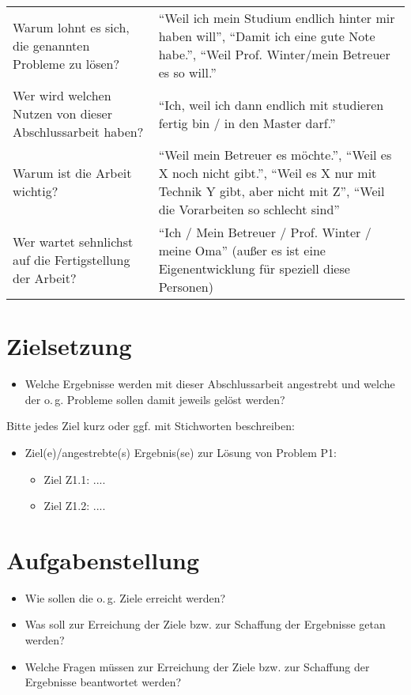 \begin{tabulary}{0.965\textwidth}{LL}
Warum lohnt es sich, die genannten Probleme zu lösen?						&\enquote{Weil ich mein Studium endlich hinter mir haben will}, \enquote{Damit ich eine gute Note habe.}, \enquote{Weil Prof. Winter/mein Betreuer es so will.}\\
Wer wird welchen Nutzen von dieser Abschlussarbeit haben?					&\enquote{Ich, weil ich dann endlich mit studieren fertig bin / in den Master darf.}\\
Warum ist die Arbeit wichtig?												&\enquote{Weil mein Betreuer es möchte.}, \enquote{Weil es X noch nicht gibt.}, \enquote{Weil es X nur mit Technik Y gibt, aber nicht mit Z}, \enquote{Weil die Vorarbeiten so schlecht sind}\\
Wer wartet sehnlichst auf die Fertigstellung der Arbeit?					&\enquote{Ich / Mein Betreuer / Prof. Winter / meine Oma} (außer es ist eine Eigenentwicklung für speziell diese Personen)\\
\end{tabulary}

\section{Zielsetzung}\label{sec:zielsetzung}

\begin{itemize}
\item Welche Ergebnisse werden mit dieser Abschlussarbeit angestrebt und welche der o.\,g. Probleme sollen damit jeweils gelöst werden?
\end{itemize}
Bitte jedes Ziel kurz oder ggf. mit Stichworten beschreiben:
\begin{itemize}
\item Ziel(e)/angestrebte(s) Ergebnis(se) zur Lösung von Problem P1:
	\begin{itemize}
	\item Ziel Z1.1: ....
	\item Ziel Z1.2: ....
	\end{itemize}
\end{itemize}

\section{Aufgabenstellung}

\begin{itemize}
\item Wie sollen die o.\,g. Ziele erreicht werden?
\item Was soll zur Erreichung der Ziele bzw. zur Schaffung der Ergebnisse getan werden?
\item Welche Fragen müssen zur Erreichung der Ziele bzw. zur Schaffung der Ergebnisse beantwortet  werden?
\end{itemize}


